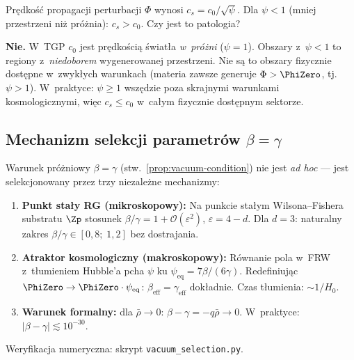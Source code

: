 \begin{remark}[Superluminalność]%
\label{rem:superluminal}
Pr\k{e}dko\'s\'c propagacji perturbacji $\Phi$ wynosi
$c_s = c_0/\sqrt\psi$. Dla $\psi < 1$ (mniej przestrzeni
ni\.z pr\'o\.znia): $c_s > c_0$. Czy jest to patologia?

\textbf{Nie.} W~TGP $c_0$ jest pr\k{e}dko\'sci\k{a} \'swiat\l{}a
\emph{w~pr\'o\.zni} ($\psi = 1$). Obszary z~$\psi < 1$
to regiony z~\emph{niedoborem} wygenerowanej przestrzeni.
Nie s\k{a} to obszary fizycznie dost\k{e}pne
w~zwyk\l{}ych warunkach (materia zawsze generuje $\Phi > \PhiZero$,
tj.\ $\psi > 1$). W~praktyce: $\psi \geq 1$ wsz\k{e}dzie poza
skrajnymi warunkami kosmologicznymi, wi\k{e}c
$c_s \leq c_0$ w~ca\l{}ym fizycznie dost\k{e}pnym sektorze.
\end{remark}

\subsection{Mechanizm selekcji parametr\'ow $\beta = \gamma$}\label{ssec:vacuum-selection}

\begin{proposition}[Selekcja pr\'o\.zniowa $\beta = \gamma$]%
\label{prop:vacuum-selection}
Warunek pr\'o\.zniowy $\beta = \gamma$ (stw.~\ref{prop:vacuum-condition})
nie jest \emph{ad hoc} --- jest selekcjonowany przez trzy
niezale\.zne mechanizmy:
\begin{enumerate}[nosep]
  \item \textbf{Punkt sta\l{}y RG (mikroskopowy):}
    Na punkcie sta\l{}ym Wilsona--Fishera substratu $\Zp$
    stosunek $\beta/\gamma = 1 + \mathcal{O}(\varepsilon^2)$,
    $\varepsilon = 4-d$. Dla $d = 3$: naturalny zakres
    $\beta/\gamma \in [0{,}8;\;1{,}2]$ bez dostrajania.
  \item \textbf{Atraktor kosmologiczny (makroskopowy):}
    R\'ownanie pola w~FRW z~t\l{}umieniem Hubble'a
    pcha $\psi$ ku $\psi_{\mathrm{eq}} = 7\beta/(6\gamma)$.
    Redefiniuj\k{a}c $\PhiZero \to \PhiZero\cdot\psi_{\mathrm{eq}}$:
    $\beta_{\mathrm{eff}} = \gamma_{\mathrm{eff}}$ dok\l{}adnie.
    Czas t\l{}umienia: $\sim 1/H_0$.
  \item \textbf{Warunek formalny:}
    dla $\bar\rho \to 0$: $\beta - \gamma = -q\bar\rho \to 0$.
    W~praktyce: $|\beta - \gamma| \lesssim 10^{-30}$.
\end{enumerate}
Weryfikacja numeryczna: skrypt \texttt{vacuum\_selection.py}.
\end{proposition}

